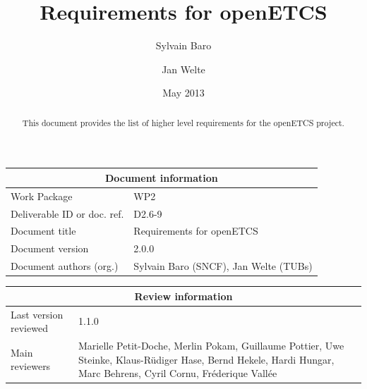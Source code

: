 \documentclass{template/openetcs_article}
\begin{document}
\frontmatter
{}




\title{Requirements for openETCS}


\date{May 2013}


\author{Sylvain Baro}
\author{Jan Welte}
  



%
\begin{abstract}
This document provides the list of higher level requirements for the openETCS project. 
\end{abstract}

\maketitle

% 

\begin{tabular}{|p{4.4cm}|p{8.7cm}|}
\hline
\multicolumn{2}{|c|}{Document information} \\
\hline
Work Package &  WP2  \\
Deliverable ID or doc. ref. & D2.6-9\\
\hline
Document title & Requirements for openETCS \\
Document version & 2.0.0 \\
Document authors (org.)  & Sylvain Baro (SNCF), Jan Welte (TUBs) \\
\hline
\end{tabular}

\begin{tabular}{|p{4.4cm}|p{8.7cm}|}
\hline
\multicolumn{2}{|c|}{Review information} \\
\hline
Last version reviewed & 1.1.0 \\
\hline
Main reviewers & Marielle Petit-Doche,  Merlin Pokam, Guillaume Pottier, Uwe Steinke, Klaus-R\"udiger Hase, Bernd Hekele,
Hardi Hungar, Marc Behrens, Cyril Cornu, Fr\'ederique Vall\'ee \\
\hline
\end{tabular}
\end{document}
